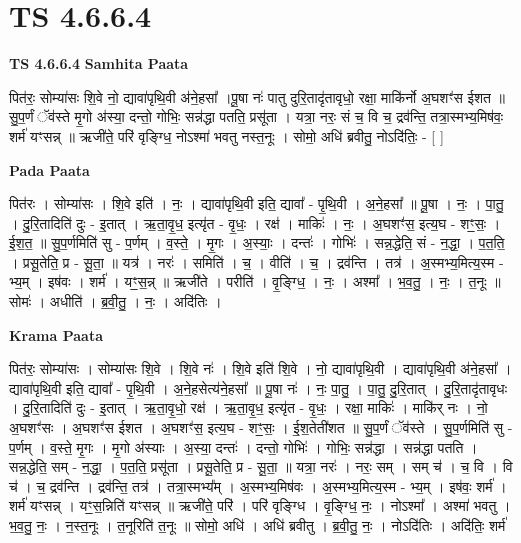 \documentclass[17pt]{extarticle}
\begin{document}
\section{ TS 4.6.6.4 }

\textbf{TS 4.6.6.4 } \newline
\textbf{Samhita Paata} \newline

पित॑रः॒ सोम्या॑सः शि॒वे नो॒ द्यावा॑पृथि॒वी अ॑ने॒हसा᳚ ।पू॒षा नः॑ पातु दुरि॒तादृ॑तावृधो॒ रक्षा॒ माकि॑र्नो अ॒घशꣳ॑स ईशत ॥ सु॒प॒र्णं ॅव॑स्ते मृ॒गो अ॑स्या॒ दन्तो॒ गोभिः॒ सन्न॑द्धा पतति॒ प्रसू॑ता । यत्रा॒ नरः॒ सं च॒ वि च॒ द्रव॑न्ति॒ तत्रा॒स्मभ्य॒मिष॑वः॒ शर्म॑ यꣳसन्न् ॥ ऋजी॑ते॒ परि॑ वृङ्ग्धि॒ नोऽश्मा॑ भवतु नस्त॒नूः । सोमो॒ अधि॑ ब्रवीतु॒ नोऽदि॑तिः॒ - [  ] \newline

\textbf{Pada Paata} \newline

पित॑रः । सोम्या॑सः । शि॒वे इति॑ । नः॒ । द्यावा॑पृथि॒वी इति॒ द्यावा᳚ - पृ॒थि॒वी । अ॒ने॒हसा᳚ ॥ पू॒षा । नः॒ । पा॒तु॒ । दु॒रि॒तादिति॑ दुः - इ॒तात् । ऋ॒ता॒वृ॒ध॒ इत्यृ॑त - वृ॒धः॒ । रक्ष॑ । माकिः॑ । नः॒ । अ॒घशꣳ॑स॒ इत्य॒घ - शꣳ॒॒सः॒ । ई॒श॒त॒ ॥ सु॒प॒र्णमिति॑ सु - प॒र्णम् । व॒स्ते॒ । मृ॒गः । अ॒स्याः॒ । दन्तः॑ । गोभिः॑ । सन्न॒द्धेति॒ सं - न॒द्धा॒ । प॒त॒ति॒ । प्रसू॒तेति॒ प्र - सू॒ता॒ ॥ यत्र॑ । नरः॑ । समिति॑ । च॒ । वीति॑ । च॒ । द्रव॑न्ति । तत्र॑ । अ॒स्मभ्य॒मित्य॒स्म - भ्य॒म् । इष॑वः । शर्म॑ । यꣳ॒॒स॒न्न् ॥ ऋजी॑ते । परीति॑ । वृ॒ङ्ग्धि॒ । नः॒ । अश्मा᳚ । भ॒व॒तु॒ । नः॒ । त॒नूः ॥ सोमः॑ । अधीति॑ । ब्र॒वी॒तु॒ । नः॒ । अदि॑तिः ।  \newline


\textbf{Krama Paata} \newline

पित॑रः॒ सोम्या॑सः । सोम्या॑सः शि॒वे । शि॒वे नः॑ । शि॒वे इति॑ शि॒वे । नो॒ द्यावा॑पृथि॒वी । द्यावा॑पृथि॒वी अ॑ने॒हसा᳚ । द्यावा॑पृथि॒वी इति॒ द्यावा᳚ - पृ॒थि॒वी । अ॒ने॒हसेत्य॑ने॒हसा᳚ ॥ पू॒षा नः॑ । नः॒ पा॒तु॒ । पा॒तु॒ दु॒रि॒तात् । दु॒रि॒तादृ॑तावृधः । दु॒रि॒तादिति॑ दुः - इ॒तात् । ऋ॒ता॒वृ॒धो॒ रक्ष॑ । ऋ॒ता॒वृ॒ध॒ इत्यृ॑त - वृ॒धः॒ । रक्षा॒ माकिः॑ । माकि॑र् नः । नो॒ अ॒घशꣳ॑सः । अ॒घशꣳ॑स ईशत । अ॒घशꣳ॑स॒ इत्य॒घ - शꣳ॒॒सः॒ । ई॒श॒तेती॑शत ॥ सु॒प॒र्णं ॅव॑स्ते । सु॒प॒र्णमिति॑ सु - प॒र्णम् । व॒स्ते॒ मृ॒गः । मृ॒गो अ॑स्याः । अ॒स्या॒ दन्तः॑ । दन्तो॒ गोभिः॑ । गोभिः॒ सन्न॑द्धा । सन्न॑द्धा पतति । सन्न॒द्धेति॒ सम् - न॒द्धा॒ । प॒त॒ति॒ प्रसू॑ता । प्रसू॒तेति॒ प्र - सू॒ता॒ ॥ यत्रा॒ नरः॑ । नरः॒ सम् । सम् च॑ । च॒ वि । वि च॑ । च॒ द्रव॑न्ति । द्रव॑न्ति॒ तत्र॑ । तत्रा॒स्मभ्य᳚म् । अ॒स्मभ्य॒मिष॑वः । अ॒स्मभ्य॒मित्य॒स्म - भ्य॒म् । इष॑वः॒ शर्म॑ । शर्म॑ यꣳसन्न् । यꣳ॒॒स॒न्निति॑ यꣳसन्न् ॥ ऋजी॑ते॒ परि॑ । परि॑ वृङ्ग्धि । वृ॒ङ्ग्धि॒ नः॒ । नोऽश्मा᳚ । अश्मा॑ भवतु । भ॒व॒तु॒ नः॒ । न॒स्त॒नूः । त॒नूरिति॑ त॒नूः ॥ सोमो॒ अधि॑ । अधि॑ ब्रवीतु । ब्र॒वी॒तु॒ नः॒ । नोऽदि॑तिः । अदि॑तिः॒ शर्म॑ \newline
\end{document}
